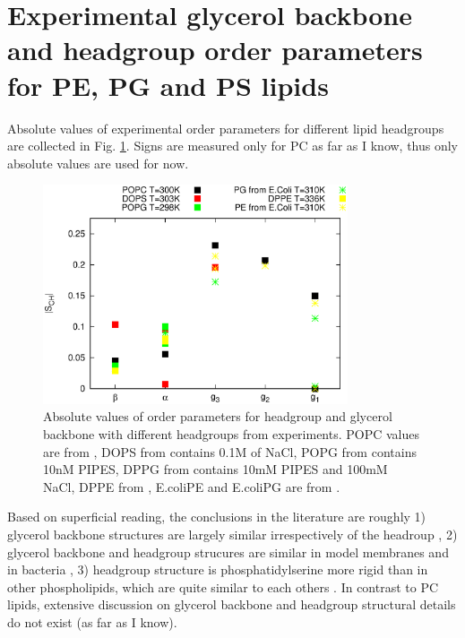 \documentclass[aps,prl,superscriptaddress,twocolumn]{revtex4}
\begin{document}

\section{Experimental glycerol backbone and headgroup order parameters for PE, PG and PS lipids}

Absolute values of experimental order parameters for different lipid headgroups are
collected in Fig. \ref{HGorderParameters}. Signs are measured only for PC as far as I know,
thus only absolute values are used for now.
\begin{figure}[]
  \centering
  \includegraphics[width=9.0cm]{../Figs/HGorderparameters.eps}
  \caption{\label{HGorderParameters}
    Absolute values of order parameters for headgroup and glycerol backbone with different headgroups
    from experiments. POPC values are from \cite{ferreira13}, DOPS from \cite{browning80} contains 0.1M of NaCl,
    POPG from \cite{borle85} contains 10nM PIPES, DPPG from \cite{wohlgemuth80} contains  10mM PIPES and 100mM NaCl,
    DPPE from \cite{seelig76}, E.coliPE and E.coliPG are from \cite{gally81}.
  }
\end{figure}

Based on superficial reading, the conclusions in the literature are roughly
1) glycerol backbone structures are largely similar irrespectively of the headroup \cite{gally81},
2) glycerol backbone and headgroup strucures are similar in model membranes and in bacteria \cite{gally81,??},
3) headgroup structure is phosphatidylserine more rigid than in other phospholipids, which are quite similar to
each others \cite{??}.
In contrast to PC lipids, extensive discussion on glycerol backbone and headgroup structural details do not
exist (as far as I know).
\end{document}
